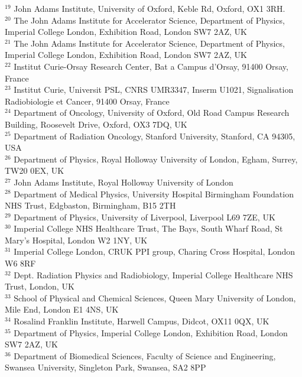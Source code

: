 {\begin{tabbing}
     $^{19}$ \> John Adams Institute, University of Oxford, Keble Rd, Oxford, OX1 3RH.\\
     $^{20}$ \> The John Adams Institute for Accelerator Science, Department of Physics, Imperial College London, Exhibition Road, London SW7 2AZ, UK\\
     $^{21}$ \> The John Adams Institute for Accelerator Science, Department of Physics, Imperial College London, Exhibition Road, London SW7 2AZ, UK\\
     $^{22}$ \> Institut Curie-Orsay Research Center, Bat a Campus d'Orsay, 91400 Orsay, France\\
     $^{23}$ \> Institut Curie, Universit PSL, CNRS UMR3347, Inserm U1021, Signalisation Radiobiologie et Cancer, 91400 Orsay, France\\
     $^{24}$ \> Department of Oncology, University of Oxford, Old Road Campus Research Building, Roosevelt Drive, Oxford, OX3 7DQ, UK\\
     $^{25}$ \> Department of Radiation Oncology, Stanford University, Stanford, CA 94305, USA\\
     $^{26}$ \> Department of Physics, Royal Holloway University of London, Egham, Surrey, TW20 0EX, UK\\
     $^{27}$ \> John Adams Institute, Royal Holloway University of London\\
     $^{28}$ \> Department of Medical Physics, University Hospital Birmingham Foundation NHS Trust, Edgbaston, Birmingham, B15 2TH\\
     $^{29}$ \> Department of Physics, University of Liverpool, Liverpool L69 7ZE, UK\\
     $^{30}$ \> Imperial College NHS Healthcare Trust, The Bays, South Wharf Road, St Mary's Hospital, London W2 1NY, UK\\
     $^{31}$ \> Imperial College London, CRUK PPI group, Charing Cross Hospital, London W6 8RF\\
     $^{32}$ \> Dept. Radiation Physics and Radiobiology, Imperial College Healthcare NHS Trust, London, UK\\
     $^{33}$ \> School of Physical and Chemical Sciences, Queen Mary University of London, Mile End, London E1 4NS, UK\\
     $^{34}$ \> Rosalind Franklin Institute, Harwell Campus, Didcot, OX11 0QX, UK\\
     $^{35}$ \> Department of Physics, Imperial College London, Exhibition Road, London SW7 2AZ, UK\\
     $^{36}$ \> Department of Biomedical Sciences, Faculty of Science and Engineering, Swansea University, Singleton Park, Swansea, SA2 8PP\\

\end{tabbing}}
